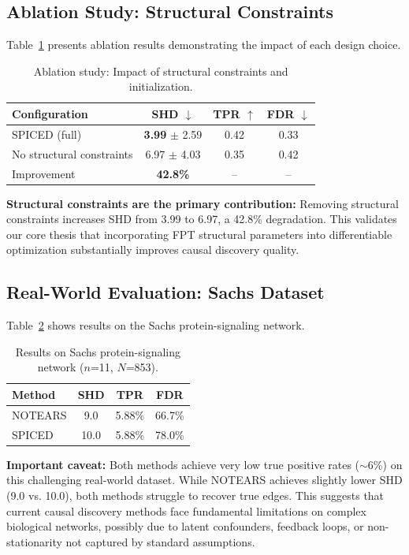 \documentclass{article}
\begin{document}
\subsection{Ablation Study: Structural Constraints}

Table~\ref{tab:ablation} presents ablation results demonstrating the impact of each design choice.

\begin{table}[t]
\caption{Ablation study: Impact of structural constraints and initialization.}
\label{tab:ablation}
\centering
\begin{tabular}{lccc}
\toprule
Configuration & SHD $\downarrow$ & TPR $\uparrow$ & FDR $\downarrow$ \\
\midrule
SPICED (full) & \textbf{3.99} $\pm$ 2.59 & 0.42 & 0.33 \\
No structural constraints & 6.97 $\pm$ 4.03 & 0.35 & 0.42 \\
\midrule
Improvement & \textbf{42.8\%} & -- & -- \\
\bottomrule
\end{tabular}
\end{table}

\textbf{Structural constraints are the primary contribution:} Removing structural constraints increases SHD from 3.99 to 6.97, a 42.8\% degradation. This validates our core thesis that incorporating FPT structural parameters into differentiable optimization substantially improves causal discovery quality.

\subsection{Real-World Evaluation: Sachs Dataset}

Table~\ref{tab:sachs} shows results on the Sachs protein-signaling network.

\begin{table}[t]
\caption{Results on Sachs protein-signaling network ($n$=11, $N$=853).}
\label{tab:sachs}
\centering
\begin{tabular}{lccc}
\toprule
Method & SHD & TPR & FDR \\
\midrule
NOTEARS & 9.0 & 5.88\% & 66.7\% \\
SPICED & 10.0 & 5.88\% & 78.0\% \\
\bottomrule
\end{tabular}
\end{table}

\textbf{Important caveat:} Both methods achieve very low true positive rates ($\sim$6\%) on this challenging real-world dataset. While NOTEARS achieves slightly lower SHD (9.0 vs. 10.0), both methods struggle to recover true edges. This suggests that current causal discovery methods face fundamental limitations on complex biological networks, possibly due to latent confounders, feedback loops, or non-stationarity not captured by standard assumptions.
\end{document}
